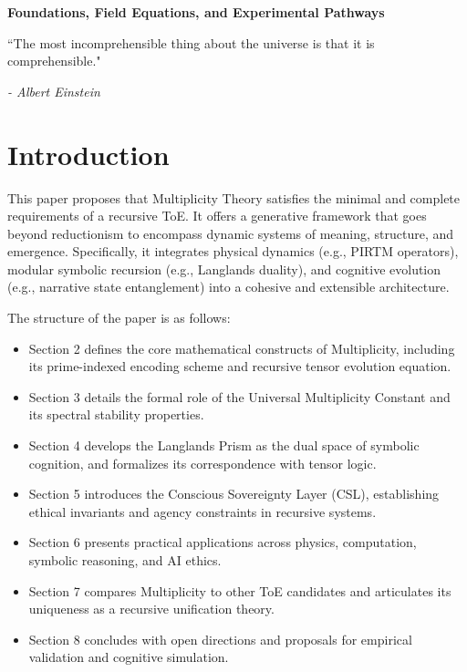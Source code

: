 \documentclass[12]{amsart}
\theoremstyle{plain}
\begin{document}
\clearpage
\clearpage
\thispagestyle{empty}
\begin{center}
    \Large\textbf{Foundations, Field Equations, and Experimental Pathways }
\end{center}

\vspace{2em}

\epigraph{“The most incomprehensible thing about the universe is that it is comprehensible."} 
{\textit{- Albert Einstein}}

\vspace{1em}
\nolinenumbers
\section{Introduction}

This paper proposes that Multiplicity Theory satisfies the minimal and complete requirements of a recursive ToE. It offers a generative framework that goes beyond reductionism to encompass dynamic systems of meaning, structure, and emergence. Specifically, it integrates physical dynamics (e.g., PIRTM operators), modular symbolic recursion (e.g., Langlands duality), and cognitive evolution (e.g., narrative state entanglement) into a cohesive and extensible architecture.

The structure of the paper is as follows:
\begin{itemize}
    \item Section 2 defines the core mathematical constructs of Multiplicity, including its prime-indexed encoding scheme and recursive tensor evolution equation.
    \item Section 3 details the formal role of the Universal Multiplicity Constant and its spectral stability properties.
    \item Section 4 develops the Langlands Prism as the dual space of symbolic cognition, and formalizes its correspondence with tensor logic.
    \item Section 5 introduces the Conscious Sovereignty Layer (CSL), establishing ethical invariants and agency constraints in recursive systems.
    \item Section 6 presents practical applications across physics, computation, symbolic reasoning, and AI ethics.
    \item Section 7 compares Multiplicity to other ToE candidates and articulates its uniqueness as a recursive unification theory.
    \item Section 8 concludes with open directions and proposals for empirical validation and cognitive simulation.
\end{itemize}
\end{document}
